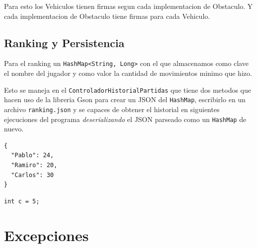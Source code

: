 \documentclass[titlepage,a4paper]{article}
\begin{document}
Para esto los Vehiculos tienen firmas segun cada implementacion de Obstaculo.
Y cada implementacion de Obstaculo tiene firmas para cada Vehiculo.

\subsection{Ranking y Persistencia}
\label{sec:org3cce553}

Para el ranking un \texttt{HashMap<String, Long>} con el que almacenamos como
clave el nombre del jugador y como valor la cantidad de movimientos
minimo que hizo.

Esto se maneja en el \texttt{ControladorHistorialPartidas} que tiene dos
metodos que hacen uso de la libreria Gson para crear un JSON del
\texttt{HashMap}, escribirlo en un archivo \texttt{ranking.json} y se capaces de
obtener el historial en siguientes ejecuciones del programa
\emph{deserializando} el JSON parseado como un \texttt{HashMap} de nuevo.

\begin{verbatim}
{
  "Pablo": 24,
  "Ramiro": 20,
  "Carlos": 30
}
\end{verbatim}

\begin{verbatim}
int c = 5;
\end{verbatim}

\section{Excepciones}
\label{sec:orge2e2209}
\end{document}
